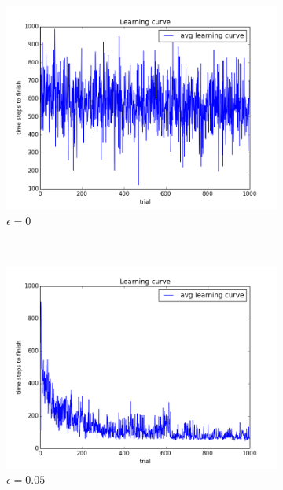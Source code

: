 \begin{figure}[h!]
\centering
\begin{subfigure}[b]{0.4\textwidth}
    \includegraphics[width=\textwidth]{figures/epsilon_0_learning_curve.png}
    \caption{\label{fig:eps0}$\epsilon = 0$}
\end{subfigure}
~
\begin{subfigure}[b]{0.4\textwidth}
    \includegraphics[width=\textwidth]{figures/epsilon_05_learning_curve.png}
    \caption{\label{fig:eps05}$\epsilon = 0.05$}
\end{subfigure}
\begin{subfigure}[b]{0.4\textwidth}

\end{subfigure}
\end{figure}
